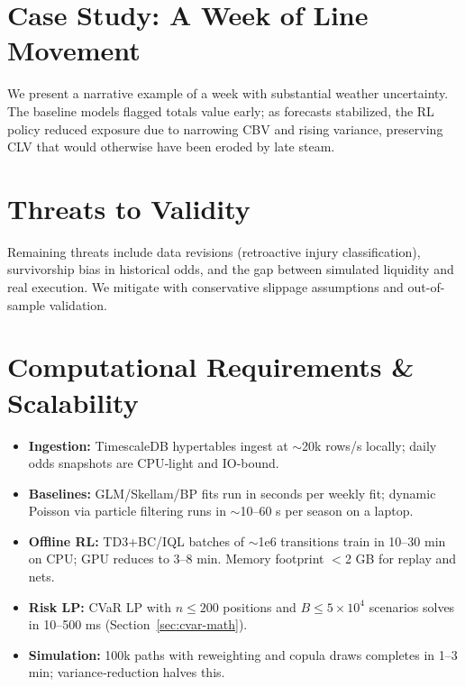\section{Case Study: A Week of Line Movement}
We present a narrative example of a week with substantial weather uncertainty. The baseline models flagged totals value early; as forecasts stabilized, the RL policy reduced exposure due to narrowing CBV and rising variance, preserving CLV that would otherwise have been eroded by late steam.

\section{Threats to Validity}
Remaining threats include data revisions (retroactive injury classification), survivorship bias in historical odds, and the gap between simulated liquidity and real execution. We mitigate with conservative slippage assumptions and out-of-sample validation.


\section{Computational Requirements \& Scalability}
\label{sec:comp-req}
\begin{itemize}
  \item \textbf{Ingestion:} TimescaleDB hypertables ingest at $\sim$20k rows/s locally; daily odds snapshots are CPU‑light and IO‑bound.
  \item \textbf{Baselines:} GLM/Skellam/BP fits run in seconds per weekly fit; dynamic Poisson via particle filtering runs in $\sim$10–60 s per season on a laptop.
  \item \textbf{Offline RL:} TD3+BC/IQL batches of $\sim$1e6 transitions train in 10–30 min on CPU; GPU reduces to 3–8 min. Memory footprint $<$2 GB for replay and nets.
  \item \textbf{Risk LP:} CVaR LP with $n\le200$ positions and $B\le5\times10^4$ scenarios solves in 10–500 ms (Section~\ref{sec:cvar-math}).
  \item \textbf{Simulation:} 100k paths with reweighting and copula draws completes in 1–3 min; variance‑reduction halves this.
\end{itemize}

